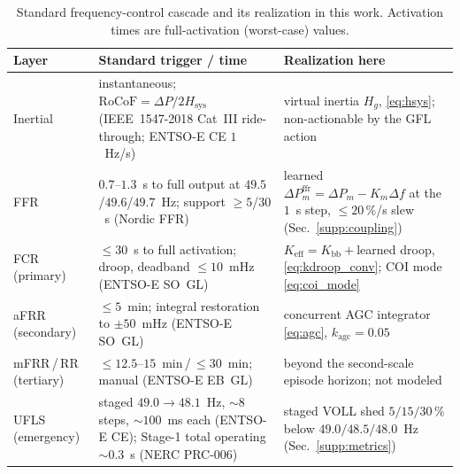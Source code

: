 \documentclass[lettersize,journal]{IEEEtran}
\begin{document}
\begin{table}[!t]
\caption{Standard frequency-control cascade and its realization in this work. Activation times are full-activation (worst-case) values.}
\label{tab:hierarchy}
\centering
\footnotesize
\setlength{\tabcolsep}{3pt}
\begin{tabular}{@{}l p{2.45cm} p{3.05cm}@{}}
\toprule
Layer & Standard trigger / time & Realization here\\
\midrule
Inertial & instantaneous; $\mathrm{RoCoF}=\Delta P/2H_{\mathrm{sys}}$ (IEEE~1547-2018 Cat~III ride-through; ENTSO-E CE $1$~Hz/s) & virtual inertia $H_g$, \eqref{eq:hsys}; non-actionable by the GFL action\\
\addlinespace
FFR & $0.7$--$1.3$~s to full output at $49.5$/$49.6$/$49.7$~Hz; support $\ge5$/$30$~s (Nordic FFR) & learned $\Delta P^{\mathrm{ffr}}_m=\Delta P_m-K_m\Delta f$ at the $1$~s step, $\le20\,\%$/s slew (Sec.~\ref{supp:coupling})\\
\addlinespace
FCR (primary) & $\le30$~s to full activation; droop, deadband $\le10$~mHz (ENTSO-E SO~GL) & $K_{\mathrm{eff}}=K_{\mathrm{bb}}+{}$learned droop, \eqref{eq:kdroop_conv}; COI mode \eqref{eq:coi_mode}\\
\addlinespace
aFRR (secondary) & $\le5$~min; integral restoration to $\pm50$~mHz (ENTSO-E SO~GL) & concurrent AGC integrator \eqref{eq:agc}, $k_{\mathrm{agc}}=0.05$\\
\addlinespace
mFRR\,/\,RR (tertiary) & $\le12.5$--$15$~min\,/\,$\le30$~min; manual (ENTSO-E EB~GL) & beyond the second-scale episode horizon; not modeled\\
\addlinespace
UFLS (emergency) & staged $49.0\!\to\!48.1$~Hz, ${\sim}8$ steps, ${\sim}100$~ms each (ENTSO-E CE); Stage-1 total operating ${\sim}0.3$~s (NERC PRC-006) & staged VOLL shed $5/15/30\,\%$ below $49.0/48.5/48.0$~Hz (Sec.~\ref{supp:metrics})\\
\bottomrule
\end{tabular}
\end{table}
\end{document}
